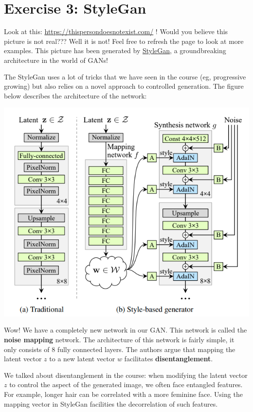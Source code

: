 \section{Exercise 3: StyleGan}

Look at this: \url{https://thispersondoesnotexist.com/} ! Would you
believe this picture is not real??? Well it is not! Feel free to refresh
the page to look at more examples. This picture has been generated by
\href{https://arxiv.org/pdf/1812.04948.pdf}{StyleGan}, a groundbreaking
architecture in the world of GANs! \newline

The StyleGan uses a lot of tricks that we have seen in the course (eg,
progressive growing) but also relies on a novel approach to controlled
generation. The figure below describes the architecture of the network: \newline

\includegraphics[width=1\linewidth]{img//genAdvNet//modernGAN/stylegan.png}

Wow! We have a completely new network in our GAN. This network is called
the \textbf{noise mapping} network. The architecture of this network is
fairly simple, it only consists of 8 fully connected layers. The authors
argue that mapping the latent vector \(z\) to a new latent vector \(w\)
facilitates \textbf{disentanglement}. \newline

We talked about disentanglement in the course: when modifying the latent
vector \(z\) to control the aspect of the generated image, we often face
entangled features. For example, longer hair can be correlated with a
more feminine face. Using the mapping vector in StyleGan facilities the
decorrelation of such features. \newline

